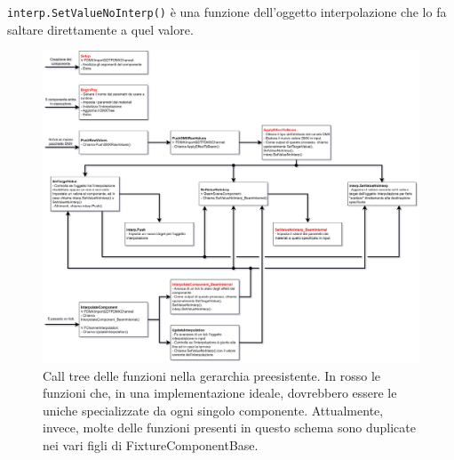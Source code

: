 \documentclass[main.tex]{subfiles}
\begin{document}
\lstinline{interp.SetValueNoInterp()} è una funzione dell'oggetto interpolazione che lo fa saltare direttamente a quel valore.

\begin{figure}[H]
    \centering
    \includegraphics[width=1\linewidth]{img/fixtureComponent/FixtureComponentCalls.png}
    \caption{Call tree delle funzioni nella gerarchia preesistente. In rosso le funzioni che, in una implementazione ideale, dovrebbero essere le uniche specializzate da ogni singolo componente. Attualmente, invece, molte delle funzioni presenti in questo schema sono duplicate nei vari figli di FixtureComponentBase.}
    \label{fig:3_CallOrderOld}
\end{figure}
\end{document}
